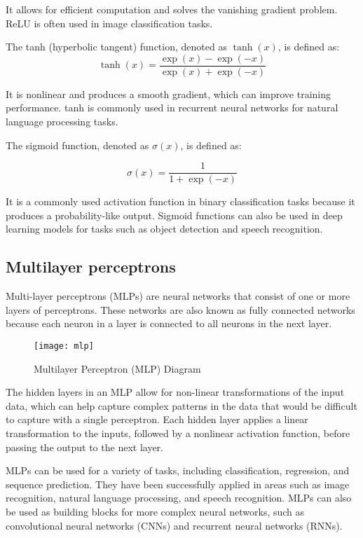 It allows for efficient computation and solves the vanishing gradient problem. 
ReLU is often used in image classification tasks.

The tanh (hyperbolic tangent) function, denoted as $\tanh(x)$, is defined as:
\begin{equation}
  \tanh(x) = \frac{\exp(x) - \exp(-x)}{\exp(x) + \exp(-x)}
\end{equation}

It is nonlinear and produces a smooth gradient, which can improve training performance. 
tanh is commonly used in recurrent neural networks for natural language processing tasks.

The sigmoid function, denoted as $\sigma(x)$, is defined as:

\begin{equation}
  \sigma(x) = \frac{1}{1 + \exp(-x)}
\end{equation}

It is a commonly used activation function in binary classification tasks because it produces a probability-like output.
Sigmoid functions can also be used in deep learning models for tasks such as object detection and speech recognition.

\subsection{Multilayer perceptrons}

Multi-layer perceptrons (MLPs) \cite{aggarwal2018neural, goodfellow2016deep} are neural networks that consist of one or more layers of perceptrons. 
These networks are also known as fully connected networks because each neuron in a layer is connected to all neurons in the next layer.

\begin{figure}[H]
  \centering
  \texttt{[image: mlp]}
  \caption{Multilayer Perceptron (MLP) Diagram \cite{uc}}
\end{figure}

The hidden layers in an MLP allow for non-linear transformations of the input data, which can help capture complex patterns in the data that would be difficult to capture with a single perceptron. 
Each hidden layer applies a linear transformation to the inputs, followed by a nonlinear activation function, before passing the output to the next layer.

MLPs can be used for a variety of tasks, including classification, regression, and sequence prediction. 
They have been successfully applied in areas such as image recognition, natural language processing, and speech recognition. MLPs can also be used as building blocks for more complex neural networks, such as convolutional neural networks (CNNs) and recurrent neural networks (RNNs).


